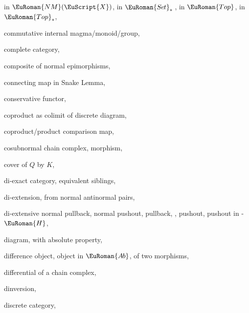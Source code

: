 \documentclass [12pt,oneside]{book}%
\theoremstyle{captionstyle}  %
\newcommand{\SetsBsd}{\EuRoman{S{\kern-0.12ex}e{\hskip-0.14ex}t}_{\ast}\,}	%
\newcommand{\Tops}{\EuRoman{Top}}											%
\newcommand{\TopsBsd}{\EuRoman{Top}_{\ast}}	%
\newcommand{\AbGrps}{\EuRoman{A{\kern-0.15ex}b}}	%
\newcommand{\Ctgry}[1]{\EuScript{#1}}					%
\newcommand{\NMonoCat}[1]{\EuRoman{NM}(\Ctgry{#1})}				%
\newcommand{\HTag}{ - {\color{Brown} $\EuRoman{H}$}}																					%
\begin{document}
\begin{theindex}
    \subitem in $\NMonoCat {X}$, 
    \subitem in $\SetsBsd $, 
    \subitem in $\Tops $, 
    \subitem in $\TopsBsd $, 
    \item commutative
    \subitem internal magma/monoid/group, 
    \item complete category, 
    \item composite
    \subitem of normal epimorphisms, 
    \item connecting map
    \subitem in Snake Lemma, 
    \item conservative
    \subitem functor, 
    \item coproduct
    \subitem as colimit of discrete diagram, 
    \item coproduct/product comparison map, 
    \item cosubnormal
    \subitem chain complex, 
    \subitem morphism, 
    \item cover
    \subitem of $Q$ by $K$, 

    \indexspace

    \item di-exact category, 
    \subitem equivalent siblings, 
    \item di-extension, 
    \subitem from normal antinormal pairs, 
    \item di-extensive
    \subitem normal pullback, 
    \subitem normal pushout, 
    \subitem pullback, , 
    \subitem pushout, 
    \subitem pushout in \HTag , 
    \item diagram, 
    \subitem with absolute property, 
    \item difference
    \subitem object, 
    \subitem object in $\AbGrps $, 
    \subitem of two morphisms, 
    \item differential of a chain complex, 
    \item dinversion, 
    \item discrete
    \subitem category, 

    \indexspace


\end{theindex}
\end{document}

